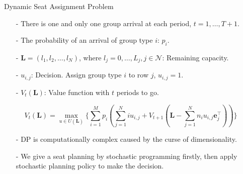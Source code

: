   \begin{frame}{Dynamic Seat Assignment Problem}
    \centering
    \small
    \begin{itemize}
    \item[-] There is one and only one group arrival at each period, $t = 1, \ldots, T+1$. 
    \item[-] The probability of an arrival of group type $i$: $p_i$.  
    \item[-] $\mathbf{L} = (l_1, l_2, \ldots, l_{N})$, where $l_j =0,\ldots, L_j, j\in \mathcal{N}$: Remaining capacity.
    \item[-] $u_{i,j}$: Decision. Assign group type $i$ to row $j$, $u_{i,j} =1$.
    \item[-] $V_{t}(\mathbf{L})$: Value function with $t$ periods to go.
    \end{itemize}

    $$V_{t}(\mathbf{L}) = \max_{u \in U(\mathbf{L})}\{ \sum_{i=1}^{M} p_i ( \sum_{j=1}^{N} i u_{i,j} + V_{t+1}(\mathbf{L}- \sum_{j=1}^{N} n_i u_{i,j}\mathbf{e}_j^{\top} ))\}$$

    \small
    \begin{itemize}
      \item[-] DP is computationally complex caused by the curse of dimensionality.
      \item[-] We give a seat planning by stochastic programming firstly, then apply stochastic planning policy to make the decision.
    \end{itemize}
\end{frame}